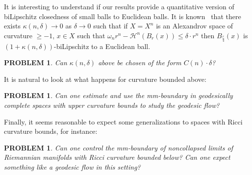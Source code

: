 \documentclass[12pt,leqno]{amsart}
\numberwithin{equation}{section}
\newtheorem{quest}[thm]{PROBLEM}
\theoremstyle{definition}
\theoremstyle{remark}
\begin{document}
It is interesting to understand if our results provide a quantitative version of biLipschitz closedness of small balls to Euclidean balls. It is known~\cite{BGP} that there exists $\kappa(n,\delta)\to 0$ as $\delta\to 0$ such that if  $X=X^n$  is an Alexandrov space of curvature $\ge -1$, $x\in X$  such that  $\omega _n r^n -\mathcal H^n (B_r (x)) \leq \delta  \cdot r ^n$ then $B_{\frac r 4} (x)$ is  $(1+\kappa(n,\delta))$-biLipschitz  to a Euclidean ball.
\begin{quest}
Can  $\kappa(n,\delta)$ above be chosen 
 of the form $C(n)\cdot \delta$? 
\end{quest}





 It is natural to look at what happens for  curvature bounded above:


\begin{quest}  \label{qe:CAT}
Can one estimate and use the mm-boundary in geodesically complete spaces with upper curvature bounds to study the geodesic flow?
\end{quest}

Finally, it seems reasonable to expect some generalizations to spaces with Ricci curvature bounds, for instance:


\begin{quest}
Can one control the mm-boundary of noncollapsed limits of Riemannian manifolds with Ricci curvature bounded below? Can one expect something like a geodesic flow in this setting?
\end{quest}
\end{document}

